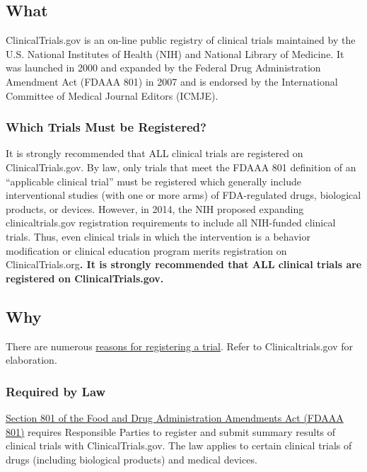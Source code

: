 \documentclass[]{book}
\begin{document}
\subsection{What}\label{what-8}

ClinicalTrials.gov is an on-line public registry of clinical trials
maintained by the U.S. National Institutes of Health (NIH) and National
Library of Medicine. It was launched in 2000 and expanded by the Federal
Drug Administration Amendment Act (FDAAA 801) in 2007 and is endorsed by
the International Committee of Medical Journal Editors (ICMJE).

\subsubsection{Which Trials Must be
Registered?}\label{which-trials-must-be-registered}

It is strongly recommended that ALL clinical trials are registered on
ClinicalTrials.gov. By law, only trials that meet the FDAAA 801
definition of an ``applicable clinical trial'' must be registered which
generally include interventional studies (with one or more arms) of
FDA-regulated drugs, biological products, or devices. However, in 2014,
the NIH proposed expanding clinicaltrials.gov registration requirements
to include all NIH-funded clinical trials. Thus, even clinical trials in
which the intervention is a behavior modification or clinical education
program merits registration on ClinicalTrials.org\textbf{. It is
strongly recommended that ALL clinical trials are registered on
ClinicalTrials.gov.}

\subsection{Why}\label{why-8}

There are numerous
\href{https://clinicaltrials.gov/ct2/manage-recs/background}{reasons for
registering a trial}. Refer to Clinicaltrials.gov for elaboration.

\subsubsection{Required by Law}\label{required-by-law}

\href{http://www.gpo.gov/fdsys/pkg/PLAW-110publ85/pdf/PLAW-110publ85.pdf\#page=82}{Section
801 of the Food and Drug Administration Amendments Act (FDAAA 801)}
requires Responsible Parties to register and submit summary results of
clinical trials with ClinicalTrials.gov. The law applies to certain
clinical trials of drugs (including biological products) and medical
devices.
\end{document}
